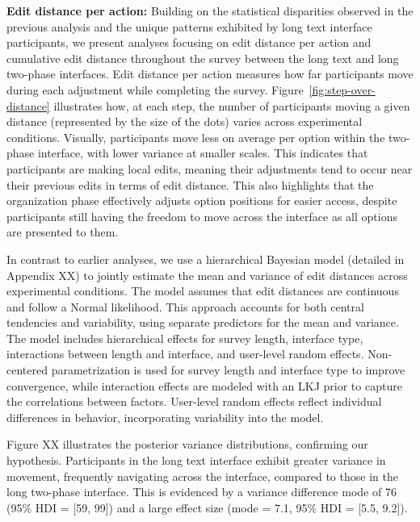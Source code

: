\textbf{Edit distance per action:} Building on the statistical disparities observed in the previous analysis and the unique patterns exhibited by long text interface participants, we present analyses focusing on edit distance per action and cumulative edit distance throughout the survey between the long text and long two-phase interfaces. Edit distance per action measures how far participants move during each adjustment while completing the survey.  Figure~\ref{fig:step-over-distance} illustrates how, at each step, the number of participants moving a given distance (represented by the size of the dots) varies across experimental conditions. Visually, participants move less on average per option within the two-phase interface, with lower variance at smaller scales. This indicates that participants are making local edits, meaning their adjustments tend to occur near their previous edits in terms of edit distance. This also highlights that the organization phase effectively adjusts option positions for easier access, despite participants still having the freedom to move across the interface as all options are presented to them.

In contrast to earlier analyses, we use a hierarchical Bayesian model (detailed in Appendix XX) to jointly estimate the mean and variance of edit distances across experimental conditions. The model assumes that edit distances are continuous and follow a Normal likelihood. This approach accounts for both central tendencies and variability, using separate predictors for the mean and variance. The model includes hierarchical effects for survey length, interface type, interactions between length and interface, and user-level random effects. Non-centered parametrization is used for survey length and interface type to improve convergence, while interaction effects are modeled with an LKJ prior to capture the correlations between factors. User-level random effects reflect individual differences in behavior, incorporating variability into the model.

Figure XX illustrates the posterior variance distributions, confirming our hypothesis. Participants in the long text interface exhibit greater variance in movement, frequently navigating across the interface, compared to those in the long two-phase interface. This is evidenced by a variance difference mode of 76 (95\% HDI = [59, 99]) and a large effect size (mode = 7.1, 95\% HDI = [5.5, 9.2]).

